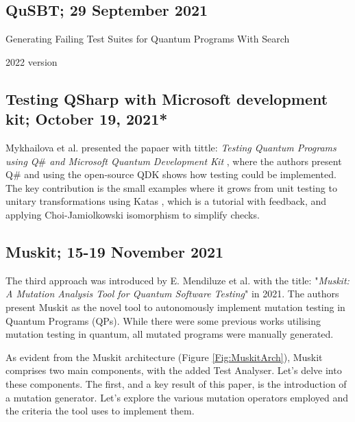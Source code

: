 \begin{itemize}
\vspace{15pt}
\subsection{QuSBT; 29 September 2021}

Generating Failing Test Suites for Quantum Programs With Search \cite{wang2021generating}

2022 version \cite{wang2022qusbt}

\vspace{15pt}
\subsection{Testing QSharp with Microsoft development kit; October 19, 2021*}

Mykhailova et al. presented the papaer with tittle: \textit{Testing Quantum Programs using Q$\#$ and Microsoft Quantum
Development Kit} \cite{mykhailova2021testing}, where the authors present Q$\#$ and using the open-source QDK shows how testing could be implemented. The key contribution is the small examples where it grows from unit testing to unitary transformations using Katas \cite{mykhailova2020quantum}, which is a tutorial with feedback, and applying Choi-Jamiolkowski isomorphism \cite{choi1975completely}\cite{jamiolkowski1972linear} to simplify checks.

\vspace{15pt}
\subsection{Muskit; 15-19 November 2021}
\label{Ch3.2.3:Muskit}
The third approach was introduced by E. Mendiluze et al. with the title: "\textit{Muskit: A Mutation Analysis Tool for Quantum Software Testing}"\cite{mendiluze2021muskit} in 2021. The authors present Muskit as the novel tool to autonomously implement mutation testing in Quantum Programs (QPs). While there were some previous works\cite{ali2021assessing}\cite{wang2021quito} utilising mutation testing in quantum, all mutated programs were manually generated.\newline

As evident from the Muskit architecture (Figure \ref{Fig:MuskitArch}), Muskit comprises two main components, with the added Test Analyser. Let's delve into these components. The first, and a key result of this paper, is the introduction of a mutation generator. Let's explore the various mutation operators employed and the criteria the tool uses to implement them.


\end{itemize}
